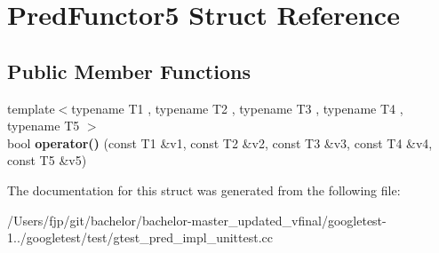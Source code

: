 \hypertarget{struct_pred_functor5}{}\section{Pred\+Functor5 Struct Reference}
\label{struct_pred_functor5}
\subsection*{Public Member Functions}
\begin{DoxyCompactItemize}
\item 
\mbox{\label{struct_pred_functor5_af9decf4d509848479ccdc4fe90129a06}} 
{\footnotesize template$<$typename T1 , typename T2 , typename T3 , typename T4 , typename T5 $>$ }\\bool {\bfseries operator()} (const T1 \&v1, const T2 \&v2, const T3 \&v3, const T4 \&v4, const T5 \&v5)
\end{DoxyCompactItemize}


The documentation for this struct was generated from the following file\+:\begin{DoxyCompactItemize}
\item 
/\+Users/fjp/git/bachelor/bachelor-\/master\+\_\+updated\+\_\+vfinal/googletest-\/1../googletest/test/gtest\+\_\+pred\+\_\+impl\+\_\+unittest.\+cc\end{DoxyCompactItemize}
